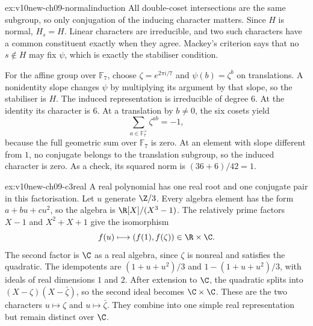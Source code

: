 \begin{solution}{ex:v10new-ch09-normalinduction}
\idea All double-coset intersections are the same subgroup, so only conjugation of the inducing character matters.
\writeup Since $H$ is normal, $H_s=H$. Linear characters are irreducible, and two such characters have a common constituent exactly when they agree. Mackey's criterion says that no $s\notin H$ may fix $\psi$, which is exactly the stabiliser condition.

For the affine group over $\mathbb F_7$, choose $\zeta=e^{2\pi i/7}$ and $\psi(b)=\zeta^b$ on translations. A nonidentity slope changes $\psi$ by multiplying its argument by that slope, so the stabiliser is $H$. The induced representation is irreducible of degree $6$. At the identity its character is $6$. At a translation by $b\ne0$, the six cosets yield
\[
\sum_{a\in\mathbb F_7^\times}\zeta^{ab}=-1,
\]
because the full geometric sum over $\mathbb F_7$ is zero. At an element with slope different from $1$, no conjugate belongs to the translation subgroup, so the induced character is zero. As a check, its squared norm is $(36+6)/42=1$.
\end{solution}

\begin{solution}{ex:v10new-ch09-c3real}
\idea A real polynomial has one real root and one conjugate pair in this factorisation.
\writeup Let $u$ generate $\Z/3$. Every algebra element has the form $a+bu+cu^2$, so the algebra is $\R[X]/(X^3-1)$. The relatively prime factors $X-1$ and $X^2+X+1$ give the isomorphism
\[
f(u)\longmapsto(f(1),f(\zeta))\in\R\times\C.
\]
The second factor is $\C$ as a real algebra, since $\zeta$ is nonreal and satisfies the quadratic. The idempotents are $(1+u+u^2)/3$ and $1-(1+u+u^2)/3$, with ideals of real dimensions $1$ and $2$. After extension to $\C$, the quadratic splits into $(X-\zeta)(X-\bar\zeta)$, so the second ideal becomes $\C\times\C$. These are the two characters $u\mapsto\zeta$ and $u\mapsto\bar\zeta$. They combine into one simple real representation but remain distinct over $\C$.
\end{solution}

